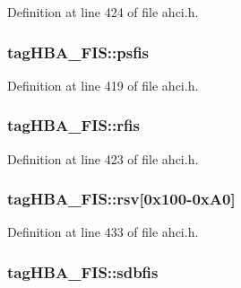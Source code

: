 Definition at line 424 of file ahci.\+h.

\subsubsection[{\texorpdfstring{psfis}{psfis}}]{ tag\+H\+B\+A\+\_\+\+F\+I\+S\+::psfis}\hypertarget{structtagHBA__FIS_ad27f145a220089dcd16395b8a78c37b3}{}\label{structtagHBA__FIS_ad27f145a220089dcd16395b8a78c37b3}


Definition at line 419 of file ahci.\+h.

\subsubsection[{\texorpdfstring{rfis}{rfis}}]{ tag\+H\+B\+A\+\_\+\+F\+I\+S\+::rfis}\hypertarget{structtagHBA__FIS_aa67907323182bb417ef30b51616ffe19}{}\label{structtagHBA__FIS_aa67907323182bb417ef30b51616ffe19}


Definition at line 423 of file ahci.\+h.

\subsubsection[{\texorpdfstring{rsv}{rsv}}]{ tag\+H\+B\+A\+\_\+\+F\+I\+S\+::rsv\mbox{[}0x100-\/0x\+A0\mbox{]}}\hypertarget{structtagHBA__FIS_a27c4d8e2aeadeca4c7dab4ff3e962f22}{}\label{structtagHBA__FIS_a27c4d8e2aeadeca4c7dab4ff3e962f22}


Definition at line 433 of file ahci.\+h.

\subsubsection[{\texorpdfstring{sdbfis}{sdbfis}}]{ tag\+H\+B\+A\+\_\+\+F\+I\+S\+::sdbfis}\hypertarget{structtagHBA__FIS_a983aaa6c08cb81a58f57f4c4ca78e11a}{}\label{structtagHBA__FIS_a983aaa6c08cb81a58f57f4c4ca78e11a}



